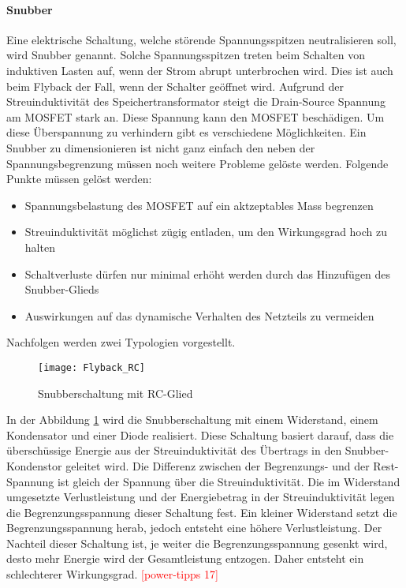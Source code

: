 

\paragraph{Snubber}
Eine elektrische Schaltung, welche störende Spannungsspitzen neutralisieren soll, wird Snubber genannt. Solche Spannungsspitzen treten beim Schalten von induktiven Lasten auf, wenn der Strom abrupt unterbrochen wird. Dies ist auch beim Flyback der Fall, wenn der Schalter geöffnet wird. Aufgrund der Streuinduktivität des Speichertransformator steigt die Drain-Source Spannung am MOSFET stark an. Diese Spannung kann den MOSFET beschädigen. Um diese Überspannung zu verhindern gibt es verschiedene Möglichkeiten. Ein Snubber zu dimensionieren ist nicht ganz einfach den neben der Spannungsbegrenzung müssen noch weitere Probleme gelöste werden. Folgende Punkte müssen gelöst werden:
\begin{itemize}
	\item Spannungsbelastung des MOSFET auf ein aktzeptables Mass begrenzen
	\item Streuinduktivität möglichst zügig entladen, um den Wirkungsgrad hoch zu halten
	\item Schaltverluste dürfen nur minimal erhöht werden durch das Hinzufügen des Snubber-Glieds
	\item Auswirkungen auf das dynamische Verhalten des Netzteils zu vermeiden
\end{itemize}
Nachfolgen werden zwei Typologien vorgestellt.

\begin{figure}[h]
	\centering
	\texttt{[image: Flyback\_RC]}
	\caption{Snubberschaltung mit RC-Glied}\label{fig:Flyback_RC}
\end{figure}

In der Abbildung \ref{fig:Flyback_RC} wird die Snubberschaltung mit einem Widerstand, einem Kondensator und einer Diode realisiert. Diese Schaltung basiert darauf, dass die überschüssige Energie aus der Streuinduktivität des Übertrags in den Snubber-Kondenstor geleitet wird. Die Differenz zwischen der Begrenzungs- und der Rest-Spannung ist gleich der Spannung über die Streuinduktivität. Die im Widerstand umgesetzte Verlustleistung und der Energiebetrag in der Streuinduktivität legen die Begrenzungsspannung dieser Schaltung fest. Ein kleiner Widerstand setzt die Begrenzungsspannung herab, jedoch entsteht eine höhere Verlustleistung. Der Nachteil dieser Schaltung ist, je weiter die Begrenzungsspannung gesenkt wird, desto mehr Energie wird der Gesamtleistung entzogen. Daher entsteht ein schlechterer Wirkungsgrad. \textcolor{red}{[power-tipps 17]}

